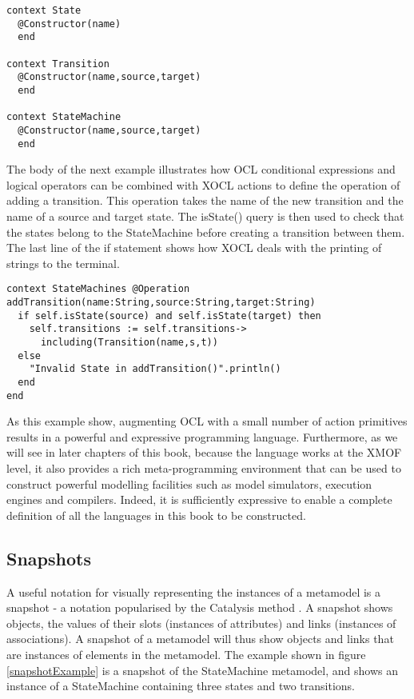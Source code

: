 \small
\begin{verbatim}
context State
  @Constructor(name)
  end

context Transition
  @Constructor(name,source,target)
  end

context StateMachine
  @Constructor(name,source,target)
  end
\end{verbatim}
\normalsize

The body of the next example illustrates how OCL conditional
expressions and logical operators can be combined with XOCL
actions to define the operation of adding a transition. This
operation takes the name of the new transition and the name of a
source and target state. The isState() query is then used to check
that the states belong to the StateMachine before creating a
transition between them. The last line of the if statement shows
how XOCL deals with the printing of strings to the terminal.

\small
\begin{verbatim}
context StateMachines @Operation
addTransition(name:String,source:String,target:String)
  if self.isState(source) and self.isState(target) then
    self.transitions := self.transitions->
      including(Transition(name,s,t))
  else
    "Invalid State in addTransition()".println()
  end
end
\end{verbatim}
\normalsize

As this example show, augmenting OCL with a small number of action
primitives results in a powerful and expressive programming
language. Furthermore, as we will see in later chapters of this
book, because the language works at the XMOF level, it also
provides a rich meta-programming environment that can be used to
construct powerful modelling facilities such as model simulators,
execution engines and compilers. Indeed, it is sufficiently
expressive to enable a complete definition of all the languages in
this book to be constructed.

\subsection{Snapshots}

A useful notation for visually representing the instances of a
metamodel is a snapshot - a notation popularised by the Catalysis
method \cite{Catalysis}. A snapshot shows objects, the values of
their slots (instances of attributes) and links (instances of
associations). A snapshot of a metamodel will thus show objects
and links that are instances of elements in the metamodel. The
example shown in figure \ref{snapshotExample} is a snapshot of the
StateMachine metamodel, and shows an instance of a StateMachine
containing three states and two transitions.

